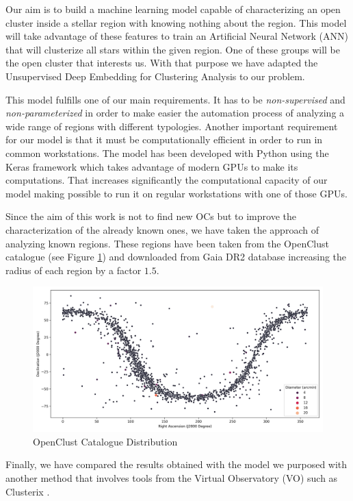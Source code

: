 \documentclass[11pt,a4paper,english,twocolumn]{article}
\begin{document}
Our aim is to build a machine learning model capable of characterizing an open
cluster inside a stellar region with knowing nothing about the region.
This model will take advantage of these features to train an Artificial Neural
Network (ANN) that will clusterize all stars within the given region.
One of these groups will be the open cluster that interests us.
With that purpose we have adapted the Unsupervised Deep Embedding for Clustering
Analysis \cite{xie2016unsupervised} to our problem.

This model fulfills one of our main requirements.
It has to be \emph{non-supervised} and \emph{non-parameterized} in order to make easier
the automation process of analyzing a wide range of regions with different typologies.
Another important requirement for our model is that it must be computationally efficient
in order to run in common workstations.
The model has been developed with Python using the Keras framework which takes
advantage of modern GPUs to make its computations.
That increases significantly the computational capacity of our model making possible
to run it on regular workstations with one of those GPUs.

Since the aim of this work is not to find new OCs but to improve the characterization
of the already known ones, we have taken the approach of analyzing known regions.
These regions have been taken from the OpenClust catalogue \cite{dias2002new}
(see Figure \ref{fig:openclust_catalogue}) and downloaded from Gaia DR2 database
increasing the radius of each region by a factor $1.5$.

\begin{figure}
    \includegraphics[width=\columnwidth]{../figures/openclust_catalogue.png}
    \caption{OpenClust Catalogue Distribution}
    \label{fig:openclust_catalogue}
\end{figure}

Finally, we have compared the results obtained with the model we purposed with another
method that involves tools from the Virtual Observatory (VO) such as Clusterix \cite{balaguer2020clusterix}.
\end{document}

